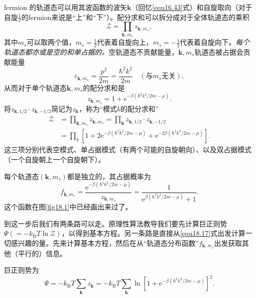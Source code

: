 fermion 的轨道态可以用其波函数的波矢$\mathbf k$（回忆\eqref{equ16.43}式）和自旋取向（对于自旋$\frac{1}{2}$的fermion来说是``上''和``下''）。配分求和可以拆分成对于全体轨道态的乘积
\begin{equation}
\mathcal Z=\prod\limits_{{\mathbf k},m_s}z_{{\mathbf k},m_s},
\end{equation}
其中$m_s$可以取两个值，$m_s=\frac{1}{2}$代表着自旋向上，$m_s=-\frac{1}{2}$代表着自旋向下。{\it 每个轨道态都亦或是空的和单占据的。}空轨道态不贡献能量，${{\mathbf k},m_s}$轨道态被占据会贡献能量
\begin{equation}
\varepsilon_{{\mathbf k},m_s}=\frac{p^2}{2m}=\frac{\hbar^2k^2}{2m}\quad (\text{与$m_s$无关}),
\end{equation}
从而对于单个轨道态${{\mathbf k},m_s}$的配分求和是
\begin{equation}
z_{{\mathbf k},m_s}=1+\mathrm e^{-\beta(\hbar^2k^2/2m-\mu)}.
\end{equation}
将$z_{{\mathbf k},1/2}\cdot z_{{\mathbf k},-1/2}$简记为$z_{\mathbf k}$，称为``模式$k$的配分求和''
\begin{equation}
\begin{aligned}
\mathcal Z &= \prod\limits_{{\mathbf k},m_s}z_{{\mathbf k},m_s} = \prod\limits_{\mathbf k}z_{{\mathbf k},1/2}\cdot z_{{\mathbf k},-1/2} \\
&=\prod\limits_k \left[1+2\mathrm e^{-\beta(\hbar^2k^2/2m-\mu)}+\mathrm e^{-2\beta(\hbar^2k^2/2m-\mu)}\right].
\end{aligned}
\end{equation}
这三项分别代表空模式、单占据模式（有两个可能的自旋朝向）、以及双占据模式（一个自旋朝上一个自旋朝下）。

每个轨道态$({{\mathbf k},m_s})$都是独立的，其占据概率为
\begin{equation}
f_{{\mathbf k},m_s}=\frac{\mathrm e^{-\beta(\hbar^2k^2/2m-\mu)}}{z_{{\mathbf k},m_s}}=\frac{1}{\mathrm e^{\beta(\hbar^2k^2/2m-\mu)}+1}.
\label{equ18.17}
\end{equation}
这个函数在图\ref{fig18.1}中已经画出来过了。

到这一步后我们有两条路可以走。原理性算法教导我们要先计算巨正则势$\Psi(=-k_\text{B}T\ln\mathcal Z)$，以得到基本方程。另一条路是直接从\eqref{equ18.17}式出发计算一切感兴趣的量。先来计算基本方程，然后在从``轨道态分布函数''$f_{{\mathbf k},m_s}$出发获取其他（平行的）信息。

巨正则势为
\begin{equation}
\Psi = -k_\text{B}T\sum\limits_{\mathbf k}z_{\mathbf k}=-k_\text{B}T\sum\limits_{\mathbf k}\ln\left[1+\mathrm e^{-\beta(\hbar^2k^2/2m-\mu)}\right]^2.
\label{equ18.18}
\end{equation}

